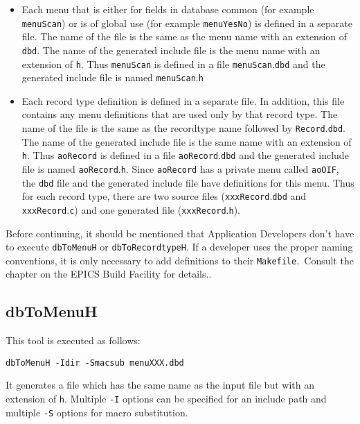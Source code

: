 \begin{itemize}\item Each menu that is either for fields in database common (for example \verb|menuScan|) or is of global use (for example 
\verb|menuYesNo|) is defined in a separate file. The name of the file is the same as the menu name with an extension of 
\verb|dbd|. The name of the generated include file is the menu name with an extension of \verb|h|. Thus \verb|menuScan| is defined 
in a file \verb|menuScan|.\verb|dbd| and the generated include file is named \verb|menuScan|.\verb|h|

\item Each record type definition is defined in a separate file. In addition, this file contains any menu definitions that are 
used only by that record type. The name of the file is the same as the recordtype name followed by \verb|Record|.\verb|dbd|. 
The name of the generated include file is the same name with an extension of \verb|h|. Thus \verb|aoRecord| is defined in a 
file \verb|aoRecord|.\verb|dbd| and the generated include file is named \verb|aoRecord|.\verb|h|. Since \verb|aoRecord| has a private menu 
called \verb|aoOIF|, the \verb|dbd| file and the generated include file have definitions for this menu. Thus for each record type, 
there are two source files (\verb|xxxRecord|.\verb|dbd| and \verb|xxxRecord|.\verb|c|) and one generated file (\verb|xxxRecord|.\verb|h|). 

\end{itemize}Before continuing, it should be mentioned that Application Developers don't have to execute \verb|dbToMenuH| or 
\verb|dbToRecordtypeH|. If a developer uses the proper naming conventions, it is only necessary to add definitions to their 
\verb|Makefile|.\verb| |Consult the chapter on the EPICS Build Facility for details..

\subsection{dbToMenuH}

This tool is executed as follows:

\begin{verbatim}dbToMenuH -Idir -Smacsub menuXXX.dbd
\end{verbatim}It generates a file which has the same name as the input file but with an extension of \verb|h|. Multiple \verb|-I| options can be 
specified for an include path and multiple \verb|-S| options for macro substitution.

